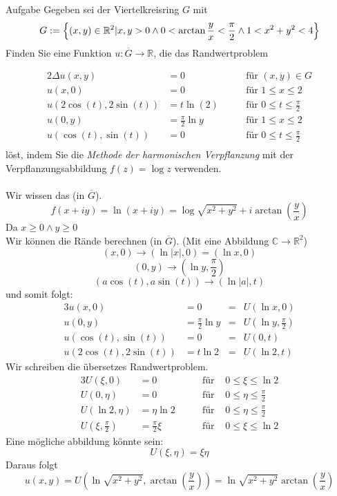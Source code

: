 \documentclass{scrartcl}
\def\mbb#1{\mathbb{#1}}
\def\bC{\mbb{C}}
\def\bR{\mbb{R}}
\newcommand{\func}[3]{#1\colon#2\to#3}
\begin{document}
\begin{section}{Aufgabe}%
Gegeben sei der Viertelkreisring $G$ mit
\[G:=\qty{(x,y)\in\bR^2 |x,y>0 \land 0<\arctan\frac{y}{x}<\frac{\pi}2 \land 1<x^2+y^2<4}\]
Finden Sie eine Funktion $\func{u}{\overline{G}}{\bR}$, die das Randwertproblem

\begin{alignat*}{2}
\Delta u(x,y)&=0 \hspace{2em}    & \text{für } (x,y)\in G\\
u(x,0)&=0 \hspace{2em}   & \text{für } 1\leq x \leq 2\\
u(2 \cos(t),2\sin(t))&=t \ln (2) \hspace{2em}   & \text{für } 0\leq t \leq \frac\pi 2\\
u(0,y)&=\frac \pi 2 \ln y \hspace{2em}   & \text{für } 1\leq x \leq 2\\
u(\cos(t),\sin(t))&=0 \hspace{2em}   & \text{für } 0\leq t \leq \frac\pi 2\\
\end{alignat*}
löst, indem Sie die {\em Methode der harmonischen Verpflanzung} mit der Verpflanzungsabbildung $f(z) = \log z$ verwenden.\\
\\
Wir wissen das (in $\overline G$).
\[f(x+i y)=\ln(x+iy)=\log\sqrt{x^2+y^2}+i \arctan(\frac y x)\]
Da $x\geq 0 \land y\geq 0$\\
Wir können die Rände berechnen (in $\overline G$). (Mit eine Abbildung $\bC \rightarrow \bR^2$)
\[(x,0)\rightarrow (\ln |x|,0)=(\ln x,0)\]
\[(0,y)\rightarrow (\ln y,\frac{\pi}{2})\] 
\[(a \cos(t),a \sin(t))\rightarrow (\ln |a|,t)\]
und somit folgt:
\begin{alignat*}{3}
u(x,0)&=0  &=&U(\ln x,0)\\
u(0,y)&=\frac \pi 2 \ln y  &=&U(\ln y,\frac \pi 2)\\
u(\cos(t),\sin(t)) &=0 &=&U(0,t)\\
u(2\cos(t),2\sin(t))&=t \ln 2  &=&U(\ln 2,t)
\end{alignat*}
Wir schreiben die übersetzes Randwertproblem.
\begin{alignat*}{3}
U(\xi,0)&=0 \hspace{2em}   & \text{für }& 0\leq \xi \leq \ln 2\\
U(0,\eta)&=0 \hspace{2em}   & \text{für }& 0\leq \eta \leq \frac \pi 2\\
U(\ln 2,\eta)&=\eta \ln 2 \hspace{2em}   & \text{für }& 0\leq \eta \leq \frac \pi 2\\
U(\xi,\frac \pi 2)&=\frac \pi 2 \xi \hspace{2em}   & \text{für }& 0\leq \xi \leq \ln 2
\end{alignat*}
Eine mögliche abbildung könnte sein:
\[U(\xi,\eta)=\xi \eta \]
Daraus folgt
\[u(x,y)=U(\ln\sqrt{x^2+y^2},\arctan(\frac y x))=\ln\sqrt{x^2+y^2}\arctan(\frac y x)\]
\end{section}
\end{document}
